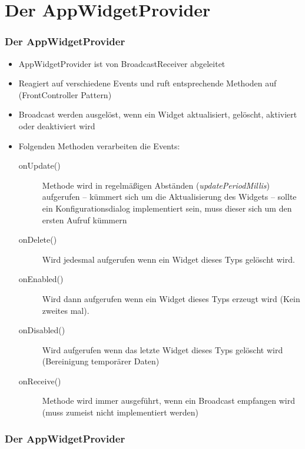 \section{Der AppWidgetProvider}
\begin{frame}[label=widget_provider]
   \frametitle{Der AppWidgetProvider}
   \begin{itemize}
      \item AppWidgetProvider ist von BroadcastReceiver abgeleitet
      \item Reagiert auf verschiedene Events und ruft entsprechende Methoden auf 
         (FrontController Pattern)
      \item Broadcast werden ausgelöst, wenn ein Widget aktualisiert, gelöscht, 
         aktiviert oder deaktiviert wird
      \item Folgenden Methoden verarbeiten die Events:
         \begin{description}
            \item[onUpdate()] Methode wird in regelmäßigen Abständen (\emph{updatePeriodMillis}) 
               aufgerufen -- kümmert sich um die Aktualisierung des Widgets -- 
               sollte ein Konfigurationsdialog implementiert sein, muss dieser sich 
               um den ersten Aufruf kümmern
            \item[onDelete()] Wird jedesmal aufgerufen wenn ein Widget dieses Typs gelöscht wird.
            \item[onEnabled()] Wird dann aufgerufen wenn ein Widget dieses 
               Typs erzeugt wird (Kein zweites mal).
            \item[onDisabled()] Wird aufgerufen wenn das letzte Widget dieses 
               Typs gelöscht wird (Bereinigung temporärer Daten)
            \item[onReceive()] Methode wird immer ausgeführt, wenn ein Broadcast 
               empfangen wird (muss zumeist nicht implementiert werden)
         \end{description}
   \end{itemize}
\end{frame}

\begin{frame}[label=widget_provider]
   \frametitle{Der AppWidgetProvider}
   
\end{frame}

